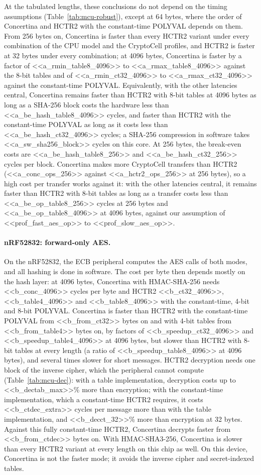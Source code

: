 At the tabulated lengths, these conclusions do not depend on the timing
assumptions (Table~\ref{tab:mcu-robust}), except at 64 bytes, where the
order of Concertina and HCTR2 with the constant-time POLYVAL depends on
them. From 256 bytes on, Concertina is faster than every HCTR2 variant under
every combination of the CPU model and the CryptoCell profiles, and HCTR2 is
faster at 32 bytes under every combination; at 4096 bytes, Concertina is
faster by a factor of <<a_rmin_table8_4096>> to
<<a_rmax_table8_4096>> against the 8-bit tables and of
<<a_rmin_ct32_4096>> to <<a_rmax_ct32_4096>> against the constant-time
POLYVAL. Equivalently, with the other latencies central,
Concertina remains faster than HCTR2 with 8-bit tables at 4096 bytes as long
as a SHA-256 block costs the hardware less than <<a_be_hash_table8_4096>>
cycles, and faster than HCTR2 with the constant-time POLYVAL as long as it
costs less than <<a_be_hash_ct32_4096>> cycles; a SHA-256 compression in
software takes <<a_sw_sha256_block>> cycles on this core. At 256 bytes, the
break-even costs are <<a_be_hash_table8_256>> and <<a_be_hash_ct32_256>>
cycles per block. Concertina makes more CryptoCell transfers than HCTR2
(<<a_conc_ops_256>> against <<a_hctr2_ops_256>> at 256 bytes), so a high
cost per transfer works against it: with the other latencies central, it
remains faster than HCTR2 with 8-bit tables as long as a transfer costs less
than <<a_be_op_table8_256>> cycles at 256 bytes and <<a_be_op_table8_4096>>
at 4096 bytes, against our assumption of <<prof_fast_aes_op>> to
<<prof_slow_aes_op>>.

\paragraph{nRF52832: forward-only AES.}
On the nRF52832, the ECB peripheral computes the AES calls of both modes,
and all hashing is done in software. The cost per byte then depends mostly on
the hash layer: at 4096 bytes, Concertina with HMAC-SHA-256 needs
<<b_conc_4096>> cycles per byte and HCTR2 <<b_ct32_4096>>, <<b_table4_4096>>
and <<b_table8_4096>> with the constant-time, 4-bit and 8-bit POLYVAL.
Concertina is faster than HCTR2 with the constant-time POLYVAL from
<<b_from_ct32>> bytes on and with 4-bit tables from <<b_from_table4>> bytes
on, by factors of <<b_speedup_ct32_4096>> and <<b_speedup_table4_4096>> at
4096 bytes,
but slower than HCTR2 with 8-bit tables at every length (a ratio of
<<b_speedup_table8_4096>> at 4096 bytes), and several times slower for short
messages. HCTR2 decryption needs one block of the inverse cipher, which the
peripheral cannot compute (Table~\ref{tab:mcu-dec}): with a table
implementation, decryption costs up to <<b_dectab_max>>\% more than
encryption; with the constant-time implementation, which a constant-time
HCTR2 requires, it costs <<b_ctdec_extra>> cycles per message more than with
the table implementation, and <<b_decct_32>>\% more than encryption at 32
bytes. Against this fully constant-time HCTR2, Concertina decrypts faster
from <<b_from_ctdec>> bytes on. With HMAC-SHA3-256, Concertina is slower
than every HCTR2 variant at every length on this chip as well. On this
device, Concertina is not the faster mode; it avoids the inverse cipher and
secret-indexed tables.

